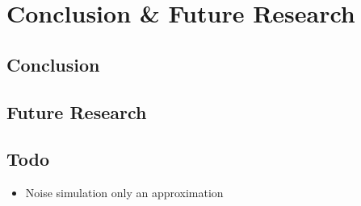 \chapter{Conclusion \& Future Research}\label{chap:Conclusion}

\section{Conclusion}\label{sec:conclusion}


\section{Future Research}\label{sec:future}


\section{Todo}\label{sec:todo}

\begin{itemize}
    \item Noise simulation only an approximation
\end{itemize}